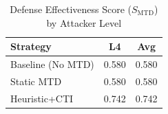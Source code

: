 \begin{table}[!t]
\centering
\caption{Defense Effectiveness Score ($S_{\mathrm{MTD}}$) by Attacker Level}
\label{tab:level_performance}
\renewcommand{\arraystretch}{1.1}
\begin{tabular}{@{}lcc@{}}
\toprule
\textbf{Strategy} & \textbf{L4} & \textbf{Avg} \\
\midrule
Baseline (No MTD) & 0.580 & 0.580 \\
Static MTD & 0.580 & 0.580 \\
Heuristic+CTI & 0.742 & 0.742 \\
\bottomrule
\end{tabular}
\end{table}
